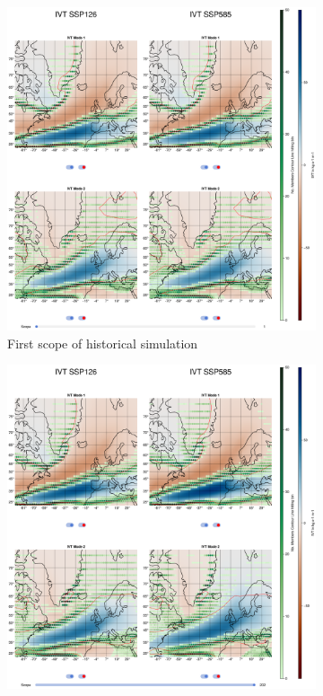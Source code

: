 \begin{figure}[!htb]
  \begin{subfigure}[b]{0.49\textwidth}
        \includegraphics[width=\textwidth]{figures/ivt_eof_2modes_historical.png}
    \caption{First scope of historical simulation}
    \label{fig:ivt spatial patterns historical}
  \end{subfigure}
  \hfill
  \begin{subfigure}[b]{0.49\textwidth}
        \includegraphics[width=\textwidth]{figures/ivt_eof_2modes_endscenario.png}

\end{subfigure}
\end{figure}
